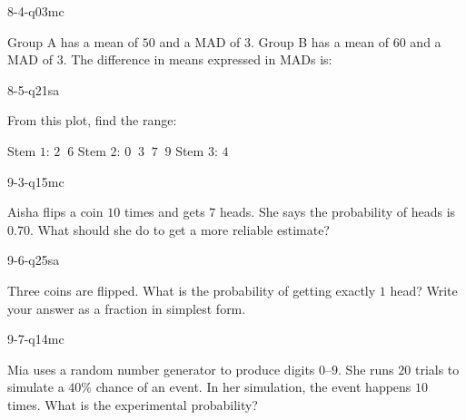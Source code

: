 \begin{practiceQuestion}{8-4-q03}{mc}
\begin{questionText}
Group A has a mean of $50$ and a MAD of $3$. Group B has a mean of $60$ and a MAD of $3$. The difference in means expressed in MADs is:
\end{questionText}
\end{practiceQuestion}

\begin{practiceQuestion}{8-5-q21}{sa}
\begin{questionText}
From this plot, find the range:

Stem $1$: $2\;\;6$ \quad Stem $2$: $0\;\;3\;\;7\;\;9$ \quad Stem $3$: $4$
\end{questionText}
\end{practiceQuestion}

\begin{practiceQuestion}{9-3-q15}{mc}
\begin{questionText}
Aisha flips a coin $10$ times and gets $7$ heads. She says the probability of heads is $0.70$. What should she do to get a more reliable estimate?
\end{questionText}
\end{practiceQuestion}

\begin{practiceQuestion}{9-6-q25}{sa}
\begin{questionText}
Three coins are flipped. What is the probability of getting exactly $1$ head? Write your answer as a fraction in simplest form.
\end{questionText}
\end{practiceQuestion}

\begin{practiceQuestion}{9-7-q14}{mc}
\begin{questionText}
Mia uses a random number generator to produce digits $0$--$9$. She runs $20$ trials to simulate a $40\%$ chance of an event. In her simulation, the event happens $10$ times. What is the experimental probability?
\end{questionText}
\end{practiceQuestion}
